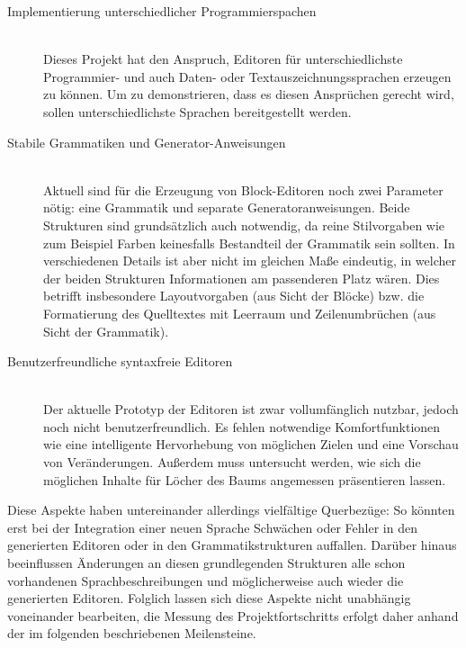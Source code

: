 \documentclass[paper=a4,fontsize=11pt,parskip=half]{scrartcl}
\begin{document}
\begin{description}
\item[Implementierung unterschiedlicher Programmierspachen] \hfill\\
  Dieses Projekt hat den Anspruch, Editoren für unterschiedlichste Programmier- und auch Daten- oder Textauszeichnungssprachen erzeugen zu können. Um zu demonstrieren, dass es diesen Ansprüchen gerecht wird, sollen unterschiedlichste Sprachen bereitgestellt werden.

\item[Stabile Grammatiken und Generator-Anweisungen] \hfill\\
  Aktuell sind für die Erzeugung von Block-Editoren noch zwei Parameter nötig: eine Grammatik und separate Generatoranweisungen. Beide Strukturen sind grundsätzlich auch notwendig, da reine Stilvorgaben wie zum Beispiel Farben keinesfalls Bestandteil der Grammatik sein sollten. In verschiedenen Details ist aber nicht im gleichen Maße eindeutig, in welcher der beiden Strukturen Informationen am passenderen Platz wären. Dies betrifft insbesondere Layoutvorgaben (aus Sicht der Blöcke) bzw. die Formatierung des Quelltextes mit Leerraum und Zeilenumbrüchen (aus Sicht der Grammatik).

\item[Benutzerfreundliche syntaxfreie Editoren] \hfill\\
  Der aktuelle Prototyp der Editoren ist zwar vollumfänglich nutzbar, jedoch noch nicht benutzerfreundlich. Es fehlen notwendige Komfortfunktionen wie eine intelligente Hervorhebung von möglichen Zielen und eine Vorschau von Veränderungen. Außerdem muss untersucht werden, wie sich die möglichen Inhalte für Löcher des Baums angemessen präsentieren lassen.
\end{description}

Diese Aspekte haben untereinander allerdings vielfältige Querbezüge: So könnten erst bei der Integration einer neuen Sprache Schwächen oder Fehler in den generierten Editoren oder in den Grammatikstrukturen auffallen. Darüber hinaus beeinflussen Änderungen an diesen grundlegenden Strukturen alle schon vorhandenen Sprachbeschreibungen und möglicherweise auch wieder die generierten Editoren. Folglich lassen sich diese Aspekte nicht unabhängig voneinander bearbeiten, die Messung des Projektfortschritts erfolgt daher anhand der im folgenden beschriebenen Meilensteine.
\end{document}
